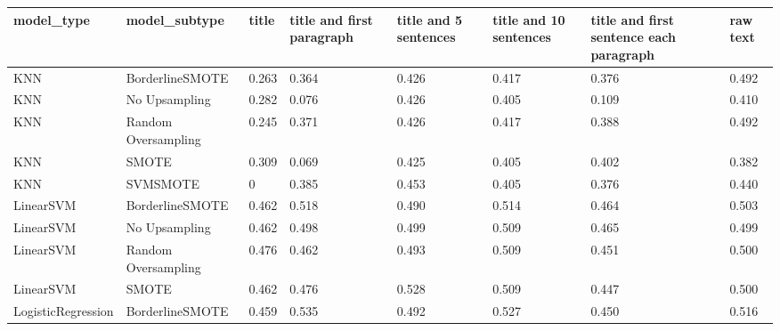 \begin{tabular}{llllllll}
\toprule
                  model\_type &       model\_subtype & title & title and first paragraph & title and 5 sentences & title and 10 sentences & title and first sentence each paragraph &  raw text \\
\midrule
                         KNN &     BorderlineSMOTE & 0.263 &                     0.364 &                 0.426 &                  0.417 &                                   0.376 &     0.492 \\
                         KNN &       No Upsampling & 0.282 &                     0.076 &                 0.426 &                  0.405 &                                   0.109 &     0.410 \\
                         KNN & Random Oversampling & 0.245 &                     0.371 &                 0.426 &                  0.417 &                                   0.388 &     0.492 \\
                         KNN &               SMOTE & 0.309 &                     0.069 &                 0.425 &                  0.405 &                                   0.402 &     0.382 \\
                         KNN &            SVMSMOTE &     0 &                     0.385 &                 0.453 &                  0.405 &                                   0.376 &     0.440 \\
                   LinearSVM &     BorderlineSMOTE & 0.462 &                     0.518 &                 0.490 &                  0.514 &                                   0.464 &     0.503 \\
                   LinearSVM &       No Upsampling & 0.462 &                     0.498 &                 0.499 &                  0.509 &                                   0.465 &     0.499 \\
                   LinearSVM & Random Oversampling & 0.476 &                     0.462 &                 0.493 &                  0.509 &                                   0.451 &     0.500 \\
                   LinearSVM &               SMOTE & 0.462 &                     0.476 &                 0.528 &                  0.509 &                                   0.447 &     0.500 \\
          LogisticRegression &     BorderlineSMOTE & 0.459 &                     0.535 &                 0.492 &                  0.527 &                                   0.450 &     0.516 \\

\end{tabular}
